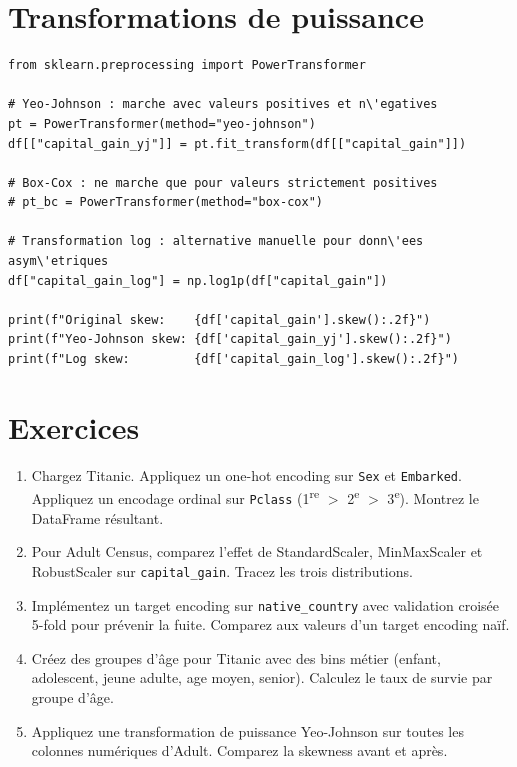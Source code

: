 \section{Transformations de puissance}

\begin{verbatim}
from sklearn.preprocessing import PowerTransformer

# Yeo-Johnson : marche avec valeurs positives et n\'egatives
pt = PowerTransformer(method="yeo-johnson")
df[["capital_gain_yj"]] = pt.fit_transform(df[["capital_gain"]])

# Box-Cox : ne marche que pour valeurs strictement positives
# pt_bc = PowerTransformer(method="box-cox")

# Transformation log : alternative manuelle pour donn\'ees asym\'etriques
df["capital_gain_log"] = np.log1p(df["capital_gain"])

print(f"Original skew:    {df['capital_gain'].skew():.2f}")
print(f"Yeo-Johnson skew: {df['capital_gain_yj'].skew():.2f}")
print(f"Log skew:         {df['capital_gain_log'].skew():.2f}")
\end{verbatim}

\section{Exercices}

\begin{exercise}
\begin{enumerate}
  \item Chargez Titanic. Appliquez un one-hot encoding sur \texttt{Sex} et \texttt{Embarked}. Appliquez un encodage ordinal sur \texttt{Pclass} (1\textsuperscript{re} $>$ 2\textsuperscript{e} $>$ 3\textsuperscript{e}). Montrez le DataFrame r\'esultant.
  \item Pour Adult Census, comparez l'effet de StandardScaler, MinMaxScaler et RobustScaler sur \texttt{capital\_gain}. Tracez les trois distributions.
  \item Impl\'ementez un target encoding sur \texttt{native\_country} avec validation crois\'ee 5-fold pour pr\'evenir la fuite. Comparez aux valeurs d'un target encoding na\"if.
  \item Cr\'eez des groupes d'\^age pour Titanic avec des bins m\'etier (enfant, adolescent, jeune adulte, age moyen, senior). Calculez le taux de survie par groupe d'\^age.
  \item Appliquez une transformation de puissance Yeo-Johnson sur toutes les colonnes num\'eriques d'Adult. Comparez la skewness avant et apr\`es.
\end{enumerate}
\end{exercise}

